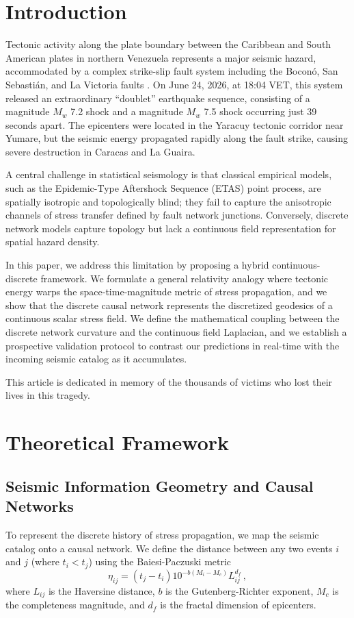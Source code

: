 \documentclass[twocolumn,amsmath,amssymb,aps,pre,superscriptaddress]{revtex4-1}
\begin{document}
\section{Introduction}
Tectonic activity along the plate boundary between the Caribbean and South American plates in northern Venezuela represents a major seismic hazard, accommodated by a complex strike-slip fault system including the Boconó, San Sebastián, and La Victoria faults \cite{Audemard2000, perez2001velocity}. On June 24, 2026, at 18:04 VET, this system released an extraordinary ``doublet'' earthquake sequence, consisting of a magnitude $M_w$ 7.2 shock and a magnitude $M_w$ 7.5 shock occurring just 39 seconds apart. The epicenters were located in the Yaracuy tectonic corridor near Yumare, but the seismic energy propagated rapidly along the fault strike, causing severe destruction in Caracas and La Guaira.

A central challenge in statistical seismology is that classical empirical models, such as the Epidemic-Type Aftershock Sequence (ETAS) point process, are spatially isotropic and topologically blind; they fail to capture the anisotropic channels of stress transfer defined by fault network junctions. Conversely, discrete network models capture topology \cite{abe2004scale, Baiesi2004} but lack a continuous field representation for spatial hazard density. 

In this paper, we address this limitation by proposing a hybrid continuous-discrete framework. We formulate a general relativity analogy where tectonic energy warps the space-time-magnitude metric of stress propagation, and we show that the discrete causal network represents the discretized geodesics of a continuous scalar stress field. We define the mathematical coupling between the discrete network curvature and the continuous field Laplacian, and we establish a prospective validation protocol to contrast our predictions in real-time with the incoming seismic catalog as it accumulates.

This article is dedicated in memory of the thousands of victims who lost their lives in this tragedy.

\section{Theoretical Framework}

\subsection{Seismic Information Geometry and Causal Networks}
\label{sec:geometry}
To represent the discrete history of stress propagation, we map the seismic catalog onto a causal network. We define the distance between any two events $i$ and $j$ (where $t_i < t_j$) using the Baiesi-Paczuski metric \cite{Baiesi2004}
\begin{equation}
\eta_{ij} = (t_j - t_i) 10^{-b(M_i - M_c)} L_{ij}^{d_f} \,,
\label{eq:metric}
\end{equation}
where $L_{ij}$ is the Haversine distance, $b$ is the Gutenberg-Richter exponent, $M_c$ is the completeness magnitude, and $d_f$ is the fractal dimension of epicenters. 
\end{document}
